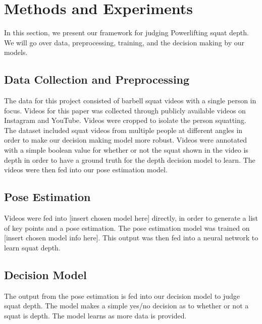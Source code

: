 \section{Methods and Experiments}
\label{sec:formatting}
In this section, we present our framework for judging Powerlifting squat depth. We will go over data, preprocessing, training, and the decision making by our models. 
\subsection{Data Collection and Preprocessing}
The data for this project consisted of barbell squat videos with a single person in focus. Videos for this paper was collected through publicly available videos on Instagram and YouTube. Videos were cropped to isolate the person squatting. The dataset included squat videos from multiple people at different angles in order to make our decision making model more robust. Videos were annotated with a simple boolean value for whether or not the squat shown in the video is depth in order to have a ground truth for the depth decision model to learn. The videos were then fed into our pose estimation model.
\subsection{Pose Estimation}
Videos were fed into [insert chosen model here] directly, in order to generate a list of key points and a pose estimation. The pose estimation model was trained on [insert chosen model info here]. This output was then fed into a neural network to learn squat depth. 
\subsection{Decision Model}
The output from the pose estimation is fed into our decision model to judge squat depth. The model makes a simple yes/no decision as to whether or not a squat is depth. The model learns as more data is provided. 



